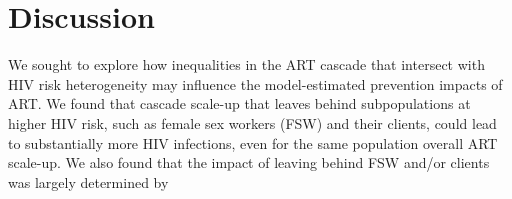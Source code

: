 \section{Discussion}\label{art.disc} %
We sought to explore how inequalities in the ART cascade
that intersect with HIV risk heterogeneity
may influence the model-estimated prevention impacts of ART.
We found that cascade scale-up that leaves behind subpopulations at higher HIV risk,
such as female sex workers (FSW) and their clients,
could lead to substantially more HIV infections,
even for the same population overall ART scale-up.
We also found that the impact of
leaving behind FSW and/or clients was largely determined by
